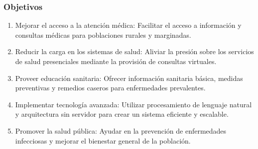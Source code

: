 	\subsubsection{Objetivos}
		\begin{enumerate}
			\item Mejorar el acceso a la atención médica: Facilitar el acceso a información y consultas médicas para poblaciones rurales y marginadas.
			
			\item Reducir la carga en los sistemas de salud: Aliviar la presión sobre los servicios de salud presenciales mediante la provisión de consultas virtuales.
			
			\item Proveer educación sanitaria: Ofrecer información sanitaria básica, medidas preventivas y remedios caseros para enfermedades prevalentes.
			
			\item Implementar tecnología avanzada: Utilizar procesamiento de lenguaje natural y arquitectura sin servidor para crear un sistema eficiente y escalable.
			
			\item Promover la salud pública: Ayudar en la prevención de enfermedades infecciosas y mejorar el bienestar general de la población.
		\end{enumerate}
		
		
		
